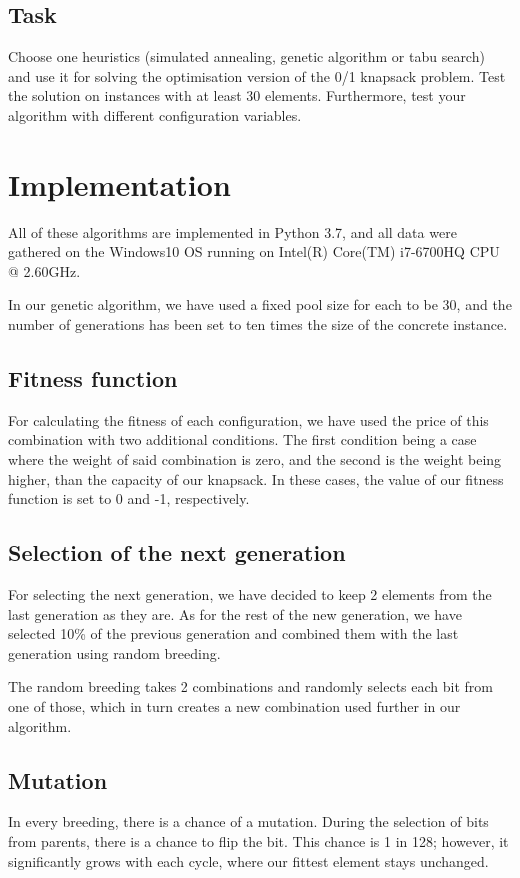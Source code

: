 \subsection{Task}

Choose one heuristics (simulated annealing, genetic algorithm or tabu search)
and use it for solving the optimisation version of the 0/1 knapsack problem.
Test the solution on instances with at least 30 elements. Furthermore, test
your algorithm with different configuration variables.



\section{Implementation}
All of these algorithms are implemented in Python 3.7, and all data were gathered on the Windows10
OS running on Intel(R) Core(TM) i7-6700HQ CPU @ 2.60GHz.

In our genetic algorithm, we have used a fixed pool size for each to be 30, and the number of
generations has been set to ten times the size of the concrete instance.

\subsection{Fitness function}
For calculating the fitness of each configuration, we have used the price of this combination
with two additional conditions. The first condition being a case where the weight of said
combination is zero, and the second is the weight being higher, than the capacity of our knapsack.
In these cases, the value of our fitness function is set to 0 and -1, respectively.

\subsection{Selection of the next generation}
For selecting the next generation, we have decided to keep 2 elements from the last generation
as they are. As for the rest of the new generation, we have selected 10\% of the previous
generation and combined them with the last generation using random breeding.

The random breeding takes 2 combinations and randomly selects each bit from one of those,
which in turn creates a new combination used further in our algorithm.

\subsection{Mutation}
In every breeding, there is a chance of a mutation. During the selection of bits from parents,
there is a chance to flip the bit. This chance is 1 in 128; however, it significantly grows with
each cycle, where our fittest element stays unchanged.

